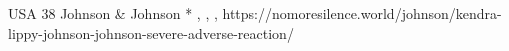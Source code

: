          {USA}
          {38}
          {Johnson \& Johnson}
          {*}
          {
            ,
            ,
            ,
          }
          {https://nomoresilence.world/johnson/kendra-lippy-johnson-johnson-severe-adverse-reaction/}


